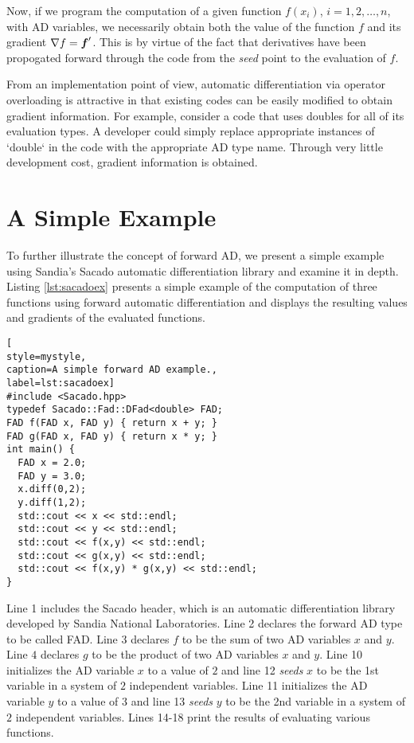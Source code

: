 Now, if we program the computation of a given function
$f(x_i)$, $i=1,2,\dots,n$, with AD variables, we necessarily obtain both the
value of the function $f$ and its gradient $\nabla f = \boldsymbol{f}'$. This is by
virtue of the fact that derivatives have been propogated forward through the
code from the \emph{seed} point to the evaluation of $f$.

From an implementation point of view, automatic differentiation via operator
overloading is attractive in that existing codes can be easily modified to
obtain gradient information. For example, consider a code that uses doubles
for all of its evaluation types. A developer could simply replace appropriate
instances of `double` in the code with the appropriate AD type name. Through
very little development cost, gradient information is obtained.

\section{A Simple Example}

To further illustrate the concept of forward AD, we present a simple example
using Sandia's Sacado automatic differentiation library and examine it in
depth. Listing \ref{lst:sacadoex} presents a simple example of the
computation of three functions using forward automatic differentiation and
displays the resulting values and gradients of the evaluated functions.

\begin{lstlisting}[
style=mystyle,
caption=A simple forward AD example.,
label=lst:sacadoex]
#include <Sacado.hpp>
typedef Sacado::Fad::DFad<double> FAD;
FAD f(FAD x, FAD y) { return x + y; }
FAD g(FAD x, FAD y) { return x * y; }
int main() {
  FAD x = 2.0;
  FAD y = 3.0;
  x.diff(0,2);
  y.diff(1,2);
  std::cout << x << std::endl;
  std::cout << y << std::endl;
  std::cout << f(x,y) << std::endl;
  std::cout << g(x,y) << std::endl;
  std::cout << f(x,y) * g(x,y) << std::endl;
}
\end{lstlisting}

Line 1 includes the Sacado header, which is an automatic differentiation
library developed by Sandia National Laboratories. Line 2 declares the
forward AD type to be called FAD. Line 3 declares $f$ to be the sum of two
AD variables $x$ and $y$. Line $4$ declares $g$ to be the product of two AD
variables $x$ and $y$. Line 10 initializes the AD variable $x$ to a value of
$2$ and line 12 \emph{seeds} $x$ to be the 1st variable in a system of $2$
independent variables. Line 11 initializes the AD variable $y$ to a value of
$3$ and line 13 \emph{seeds} $y$ to be the 2nd variable in a system of $2$
independent variables. Lines 14-18 print the results of evaluating various
functions.

